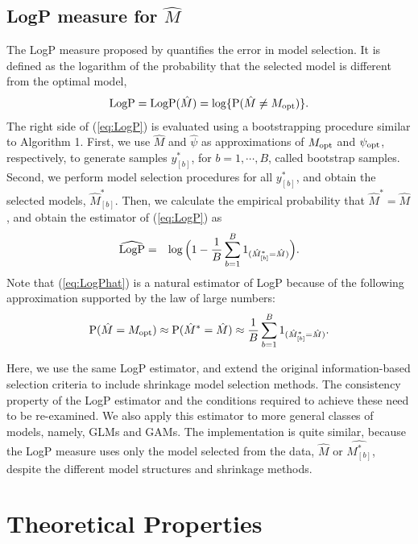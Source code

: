 \documentclass[12pt]{article} %
\theoremstyle{definition}
\begin{document}
\subsection{LogP measure for $\hat{M}$}
\hspace{4mm}
The LogP measure proposed by \citet{Liu2021} quantifies the error in model selection. It is defined as the logarithm of the probability that the selected model is different from the optimal model,
 \begin{eqnarray}\label{eq:LogP}
 {\rm LogP}={\rm LogP}(\hat{M})=\log\{{\rm P}(\hat{M}\neq M_{\rm opt})\}.
 \end{eqnarray}
 The right side of (\ref{eq:LogP}) is evaluated using a bootstrapping procedure similar to Algorithm 1. First, we use $\hat{M}$ and $\hat{\psi}$ as approximations of $M_{\rm opt}$ and $\psi_{\rm opt}$, respectively, to generate samples $y^*_{[b]}$, for $b=1,\cdots, B$, called bootstrap samples. Second, we perform model selection procedures for all $y^*_{[b]}$, and obtain the selected models, $\hat {M}^*_{[b]}$. Then, we calculate the empirical probability that $\hat{M}^*= \hat{M}$, and obtain the estimator of (\ref{eq:LogP}) as
  \begin{eqnarray}\label{eq:LogPhat}
 \widehat{\rm LogP}&=&\log\Big(1-\frac{1}{B}\sum_{b=1}^B1_{(\hat{M}^*_{[b]}=\hat{M})}\Big).
 \end{eqnarray}
 Note that (\ref{eq:LogPhat}) is a natural estimator of LogP because of the following approximation supported by the law of large numbers:
 \begin{eqnarray}
 {\rm P}(\hat{M}= M_{\rm opt})\approx {\rm P}(\hat{M}^*= \hat{M})\approx
 \frac{1}{B}\sum_{b=1}^B1_{(\hat{M}^*_{[b]}=\hat{M})}.
  \end{eqnarray}
 
Here, we use the same LogP estimator, and extend the original information-based selection criteria to include shrinkage model selection methods. The consistency property of the LogP estimator and the conditions required to achieve these need to be re-examined. We also apply this estimator to more general classes of models, namely, GLMs and GAMs. The implementation is quite similar, because the LogP measure uses only the model selected from the data, $\hat{M}$ or $\hat{M^*_{[b]}}$, despite the different model structures and shrinkage methods.  
\section{Theoretical Properties}\label{sec_proof}
\end{document}
